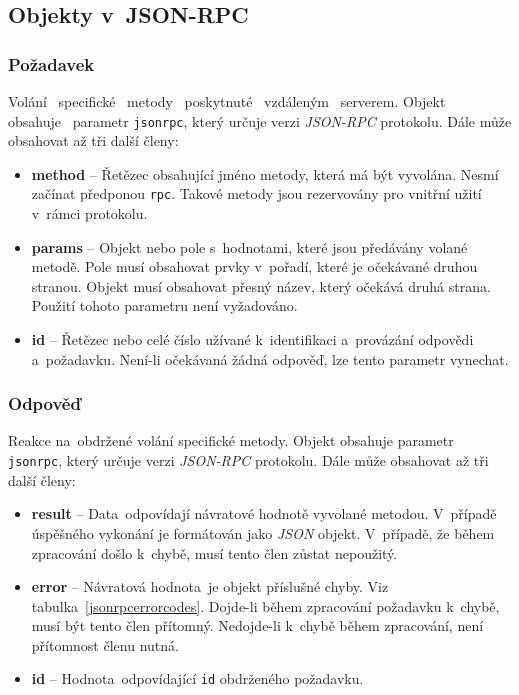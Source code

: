 \subsection{Objekty v~JSON-RPC}

\subsubsection{Požadavek}
Volání~ specifické~ metody~ poskytnuté~ vzdáleným~ serverem. Objekt~ obsahuje~ parametr \texttt{jsonrpc}, který určuje verzi \textit{JSON-RPC} protokolu. Dále může obsahovat až tři další členy:

\begin{itemize}
    \item{\textbf{method} -- Řetězec obsahující jméno metody, která má být vyvolána. Nesmí začínat předponou \texttt{rpc}. Takové metody jsou rezervovány pro vnitřní užití v~rámci protokolu. 
    }
    \item{\textbf{params} -- Objekt nebo pole s~hodnotami, které jsou předávány volané metodě. Pole musí obsahovat prvky v~pořadí, které je očekávané druhou stranou. Objekt musí obsahovat přesný název, který očekává druhá strana. Použití tohoto parametru není vyžadováno.
    }
    \item{\textbf{id} -- Řetězec nebo celé číslo užívané k~identifikaci a~provázání odpovědi a~požadavku. Není-li očekávaná žádná odpověď, lze tento parametr vynechat.
    }
\end{itemize}

\subsubsection{Odpověď}
Reakce na~obdržené volání specifické metody. Objekt obsahuje parametr \texttt{jsonrpc}, který určuje verzi \emph{JSON-RPC} protokolu. Dále může obsahovat až tři další členy:

\begin{itemize}
    \item{\textbf{result} -- Data~odpovídají návratové hodnotě vyvolané metodou. V~případě úspěšného vykonání je formátován jako \emph{JSON} objekt. V~případě, že během zpracování došlo k~chybě, musí tento člen zůstat nepoužitý.
    }
    \item{\textbf{error} -- Návratová hodnota~je objekt příslušné chyby. Viz tabulka~\ref{jsonrpcerrorcodes}. Dojde-li během zpracování požadavku k~chybě, musí být tento člen přítomný. Nedojde-li k~chybě během zpracování, není přítomnost členu nutná.
    }
    \item{\textbf{id} -- Hodnota~odpovídající \texttt{id} obdrženého požadavku.
    }
\end{itemize}

